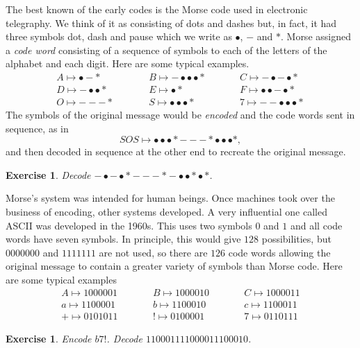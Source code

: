\documentclass[12pt,a4paper]{article}
\theoremstyle{plain}
\newtheorem{exercise}[theorem]{Exercise}
\theoremstyle{definition}
\begin{document}
    The best known of the early codes is the Morse code
    used in electronic telegraphy.
    We think of it as consisting of dots and
    dashes but, in fact, it had three symbols dot, dash and pause
    which we write as $\bullet$, $-$ and $*$.
    Morse assigned a \emph{code word} consisting of a
    sequence of symbols to each of the letters of the alphabet
    and each digit. Here are some typical examples.
    \begin{align*}
        A\mapsto \bullet-*\qquad
        &&B\mapsto -\bullet\bullet\bullet*\qquad
        &&C\mapsto-\bullet-\bullet*\\
        D\mapsto -\bullet\bullet*\qquad
        &&E\mapsto \bullet*\qquad
        &&F\mapsto\bullet\bullet-\bullet*\\
        O\mapsto ---*\qquad
        &&S\mapsto\bullet\bullet\bullet*\qquad
        &&7\mapsto--\bullet\bullet\bullet*
    \end{align*}
    The symbols of the original message would be \emph{encoded}
    and the code words sent in sequence, as in
    \[SOS\mapsto
    \bullet\bullet\bullet*---*\bullet\bullet\bullet*,\]
    and then decoded in sequence at the other end
    to recreate the original message.
    \begin{exercise}
        \label{E;Morse}
        Decode
        $-\bullet-\bullet*---*-\bullet\bullet* \bullet*$.
    \end{exercise}

    Morse's system was intended for human beings.
    Once machines took over the business of encoding,
    other systems developed. A very influential
    one called ASCII was developed in the 1960s.
    This uses two symbols $0$ and $1$
    and all code words have seven symbols.
    In principle, this would give $128$ possibilities, but $0000000$
    and $1111111$ are not used, so there are $126$ code words
    allowing the original message to contain a greater
    variety of symbols than Morse code.
    Here are some typical examples
    \begin{align*}
        A\mapsto 1000001\qquad
        &&B\mapsto 1000010\qquad
        &&C\mapsto 1000011\\
        a\mapsto 1100001\qquad
        &&b\mapsto 1100010 \qquad
        &&c\mapsto 1100011\\
        +\mapsto 0101011\qquad
        &&!\mapsto 0100001\qquad
        &&7\mapsto 0110111
    \end{align*}
    \begin{exercise}
        \label{E;ASCII}
        Encode $b7!$. Decode $110001111000011100010$.
    \end{exercise}
\end{document}
